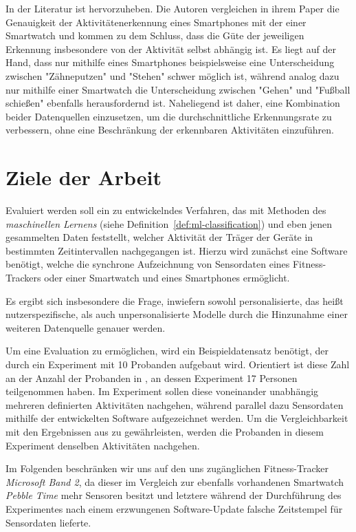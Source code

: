 In der Literatur ist \cite{Weiss2016} hervorzuheben. Die Autoren vergleichen in ihrem Paper die Genauigkeit der Aktivitätenerkennung eines Smartphones mit der einer Smartwatch und kommen zu dem Schluss, dass die Güte der jeweiligen Erkennung insbesondere von der Aktivität selbst abhängig ist. Es liegt auf der Hand, dass nur mithilfe eines Smartphones beispielsweise eine Unterscheidung zwischen "Zähneputzen" und "Stehen" schwer möglich ist, während analog dazu nur mithilfe einer Smartwatch die Unterscheidung zwischen "Gehen" und "Fußball schießen" ebenfalls herausfordernd ist. Naheliegend ist daher, eine Kombination beider Datenquellen einzusetzen, um die durchschnittliche Erkennungsrate zu verbessern, ohne eine Beschränkung der erkennbaren Aktivitäten einzuführen.

\section{Ziele der Arbeit} %
Evaluiert werden soll ein zu entwickelndes Verfahren, das mit Methoden des \textit{maschinellen Lernens} (siehe Definition~\ref{def:ml-classification}) und eben jenen gesammelten Daten feststellt, welcher Aktivität der Träger der Geräte in bestimmten Zeitintervallen nachgegangen ist. Hierzu wird zunächst eine Software benötigt, welche die synchrone Aufzeichnung von Sensordaten eines Fitness-Trackers oder einer Smartwatch und eines Smartphones ermöglicht.

Es ergibt sich insbesondere die Frage, inwiefern sowohl personalisierte, das heißt nutzerspezifische, als auch unpersonalisierte Modelle durch die Hinzunahme einer weiteren Datenquelle genauer werden.

Um eine Evaluation zu ermöglichen, wird ein Beispieldatensatz benötigt, der durch ein Experiment mit 10 Probanden aufgebaut wird. Orientiert ist diese Zahl an der Anzahl der Probanden in \cite{Weiss2016}, an dessen Experiment 17 Personen teilgenommen haben. Im Experiment sollen diese voneinander unabhängig mehreren definierten Aktivitäten nachgehen, während parallel dazu Sensordaten mithilfe der entwickelten Software aufgezeichnet werden. Um die Vergleichbarkeit mit den Ergebnissen aus \cite{Weiss2016} zu gewährleisten, werden die Probanden in diesem Experiment denselben Aktivitäten nachgehen.

Im Folgenden beschränken wir uns auf den uns zugänglichen Fitness-Tracker \textit{Microsoft Band 2}, da dieser im Vergleich zur ebenfalls vorhandenen Smartwatch \textit{Pebble Time} mehr Sensoren besitzt und letztere während der Durchführung des Experimentes nach einem erzwungenen Software-Update falsche Zeitstempel für Sensordaten lieferte. 

